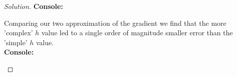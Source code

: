 \documentclass[12pt]{article}
\makeatletter
\theoremstyle{homework}
\newenvironment{exercise}[1]
{\def\@currentlabel{#1}\exercisecore}
{\endexercisecore}
\makeatother
\begin{document}
\begin{exercise}{P18}
\begin{proof}[Solution]
    \textbf{Console:}
    \begin{center}
      
    \end{center}

    Comparing our two approximation of the gradient we find that the more 'complex' $h$ value led to a single order of magnitude smaller 
    error than the 'simple' $h$ value.\\


    \textbf{Console:}
    \begin{center}
      
    \end{center}
  \end{proof}
\end{exercise}
\vspace{.5in}
\end{document}
